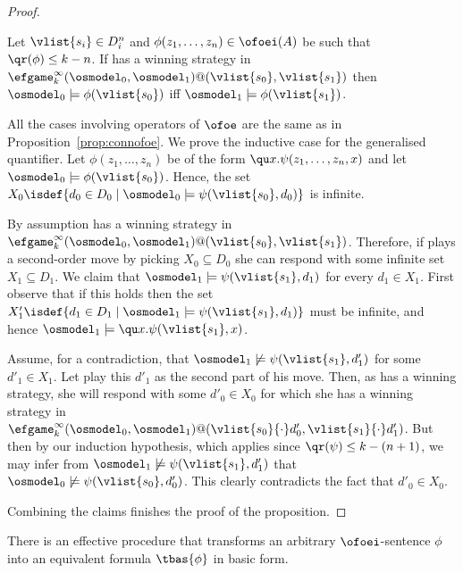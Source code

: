 \begin{proof}
\begin{claim}
Let $\vlist{s_i} \in D_i^n$ and $\phi(z_1,\dots,z_n) \in \ofoei(A)$ be such
that $\qr(\phi) \leq k-n$. 
If \eloise has a winning strategy in 
$\efgame_k^\infty(\osmodel_0,\osmodel_1)@(\vlist{s_0},\vlist{s_1})$ then 
$\osmodel_0 \models \phi(\vlist{s_0})$ iff 
$\osmodel_1 \models \phi(\vlist{s_1})$.
\end{claim}
	
\begin{pfclaim}
All the cases involving operators of $\ofoe$ are the same as in 
Proposition~\ref{prop:connofoe}. 
We prove the inductive case for the generalised quantifier. 
Let $\phi(z_1,\dots,z_n)$ be of the form $\qu x.\psi(z_1,\dots,z_n,x)$ and 
let $\osmodel_0 \models \phi(\vlist{s_0})$. 
Hence, the set $X_{0} \isdef \{ d_{0} \in D_{0} \mid \osmodel_0 \models 
\psi(\vlist{s_0},d_0) \}$ is infinite.

By assumption \eloise has a winning strategy in 
$\efgame_k^\infty(\osmodel_0,\osmodel_1)@(\vlist{s_0},\vlist{s_1})$.
Therefore, if \abelard plays a second-order move by picking $X_0 \subseteq D_0$
she can respond with some infinite set $X_1 \subseteq D_1$. 
We claim that 
$\osmodel_1 \models \psi(\vlist{s_1},d_1)$ for every $d_1\in X_1$. 
First observe that if this holds then the set $X'_1 \isdef  \{ d_1 \in D_1 \mid 
\osmodel_1 \models \psi(\vlist{s_1},d_1)\}$ must be infinite, and hence 
$\osmodel_1 \models \qu x.\psi(\vlist{s_1},x)$.


Assume, for a contradiction, that $\osmodel_1 \not\models \psi(\vlist{s_1},d'_1)$
for some $d'_1\in X_1$. 
Let \abelard play this $d'_1$ as the second part of his move. 
Then, as \eloise has a winning strategy, she will respond with some $d'_0 \in 
X_0$ for which she has a winning strategy in 
$\efgame_{k}^\infty(\osmodel_0,\osmodel_1)%
  @(\vlist{s_0}{\cdot}d'_0,\vlist{s_1}{\cdot}d'_1)$. 
But then by our induction hypothesis, which applies since $\qr(\psi) \leq
k-(n+1)$, we may infer from $\osmodel_1 \not\models \psi(\vlist{s_1},d'_1)$
that $\osmodel_0 \not\models \psi(\vlist{s_0},d'_0)$.
This clearly contradicts the fact that $d'_{0} \in X_{0}$.
\end{pfclaim}
	
\noindent
Combining the claims finishes the proof of the proposition.
\end{proof}


\begin{theorem}
\label{thm:bfofoei}
There is an effective procedure that transforms an arbitrary $\ofoei$-sentence 
$\phi$ into an equivalent formula $\tbas{\phi}$ in basic form.
\end{theorem}

